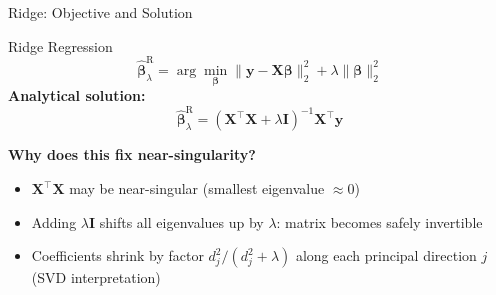 \documentclass[aspectratio=169, 10pt]{beamer}
\begin{document}
\begin{frame}{Ridge: Objective and Solution}
  \begin{definitionbox}{Ridge Regression}
    \[
      \hat{\bm{\beta}}^{\mathrm{R}}_\lambda
      = \arg\min_{\bm{\beta}} \|\mathbf{y} - \mathbf{X}\bm{\beta}\|_2^2
        + \lambda \|\bm{\beta}\|_2^2
    \]
    \textbf{Analytical solution:}
    \[
      \hat{\bm{\beta}}^{\mathrm{R}}_\lambda
      = \left(\mathbf{X}^\top\mathbf{X} + \lambda \mathbf{I}\right)^{-1}
        \mathbf{X}^\top\mathbf{y}
    \]
  \end{definitionbox}

  \medskip
  \textbf{Why does this fix near-singularity?}
  \begin{itemize}
    \item $\mathbf{X}^\top\mathbf{X}$ may be near-singular (smallest eigenvalue $\approx 0$)
    \item Adding $\lambda\mathbf{I}$ shifts all eigenvalues up by $\lambda$:
          matrix becomes safely invertible \parencite{HoerlKennard1970}
    \item Coefficients shrink by factor $d_j^2 / (d_j^2 + \lambda)$ along
          each principal direction $j$ (SVD interpretation)
  \end{itemize}
\end{frame}
\end{document}

